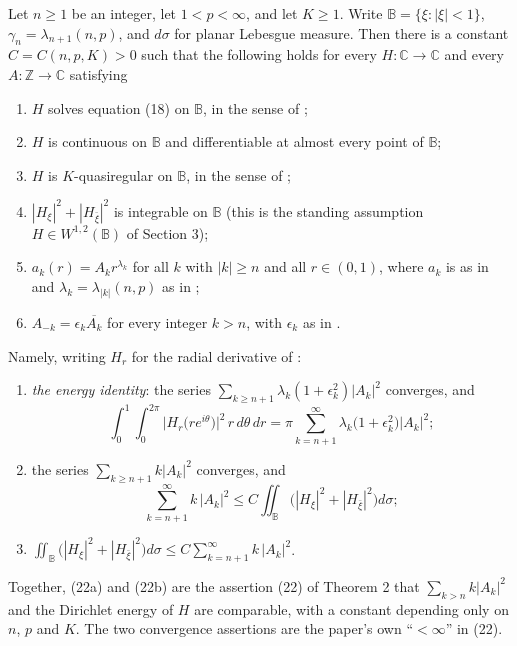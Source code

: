 \begin{lemma}
Let $n\ge1$ be an integer, let $1<p<\infty$, and let $K\ge1$.
Write $\mathbb{B}=\{\xi:|\xi|<1\}$, $\gamma_n=\lambda_{n+1}(n,p)$, and
$d\sigma$ for planar Lebesgue measure.  Then there is a constant
$C=C(n,p,K)>0$ such that the following holds for every
$H\colon\mathbb{C}\to\mathbb{C}$ and every $A\colon\mathbb{Z}\to\mathbb{C}$
satisfying
\begin{enumerate}
\item[(H0)] $H$ solves equation (18) on $\mathbb{B}$, in the sense of
  ;
\item[(H1)] $H$ is continuous on $\mathbb{B}$ and differentiable at almost
  every point of $\mathbb{B}$;
\item[(H2)] $H$ is $K$-quasiregular on $\mathbb{B}$, in the sense of
  ;
\item[(H3)] $|H_\xi|^2+|H_{\bar\xi}|^2$ is integrable on $\mathbb{B}$
  (this is the standing assumption $H\in W^{1,2}(\mathbb{B})$ of Section 3);
\item[(H4)] $a_k(r)=A_kr^{\lambda_k}$ for all $k$ with $|k|\ge n$ and all
  $r\in(0,1)$, where $a_k$ is as in  and
  $\lambda_k=\lambda_{|k|}(n,p)$ as in ;
\item[(H5)] $A_{-k}=\epsilon_k\overline{A_k}$ for every integer $k>n$, with
  $\epsilon_k$ as in .
\end{enumerate}
Namely, writing $H_r$ for the radial derivative of :
\begin{enumerate}
\item[(E)] \emph{the energy identity}: the series
$\sum_{k\ge n+1}\lambda_k(1+\epsilon_k^2)|A_k|^2$ converges, and
\[
  \int_0^1\!\!\int_0^{2\pi}\bigl|H_r\bigl(re^{i\theta}\bigr)\bigr|^2\,r\,d\theta\,dr
  =\pi\sum_{k=n+1}^{\infty}\lambda_k\bigl(1+\epsilon_k^2\bigr)|A_k|^2 ;
\]
\item[(22a)] the series $\sum_{k\ge n+1}k|A_k|^2$ converges, and
\[
  \sum_{k=n+1}^{\infty}k\,|A_k|^2
  \le C\iint_{\mathbb{B}}\bigl(|H_\xi|^2+|H_{\bar\xi}|^2\bigr)d\sigma ;
\]
\item[(22b)] $\displaystyle\iint_{\mathbb{B}}\bigl(|H_\xi|^2+|H_{\bar\xi}|^2\bigr)d\sigma
  \le C\sum_{k=n+1}^{\infty}k\,|A_k|^2$.
\end{enumerate}
Together, (22a) and (22b) are the assertion (22) of Theorem 2 that
$\sum_{k>n}k|A_k|^2$ and the Dirichlet energy of $H$ are comparable, with a
constant depending only on $n$, $p$ and $K$.  The two convergence assertions
are the paper's own ``$<\infty$'' in (22).


\end{lemma}
